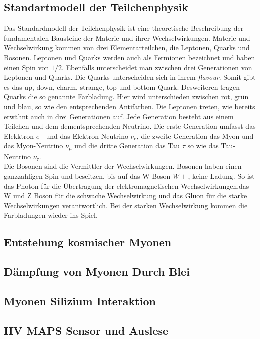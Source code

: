 \subsection{Standartmodell der Teilchenphysik} \label{standartmodell}
Das Standardmodell der Teilchenphysik ist eine theoretische Beschreibung der fundamentalen Bausteine der Materie und ihrer Wechselwirkungen.
Materie und Wechselwirkung kommen von drei Elementarteilchen, die Leptonen, Quarks und Bosonen. 
Leptonen und Quarks werden auch als Fermionen bezeichnet und haben einen Spin von $1/2$. 
Ebenfalls unterscheidet man zwischen drei Generationen von Leptonen und Quarks. 
Die Quarks unterscheiden sich in ihrem \textit{flavour}. 
Somit gibt es das up, down, charm, strange, top und bottom Quark. 
Desweiteren tragen Quarks die so genannte Farbladung.
Hier wird unterschieden zwischen rot, grün und blau, so wie den entsprechenden Antifarben. 
Die Leptonen treten, wie bereits erwähnt auch in drei Generationen auf. 
Jede Generation besteht aus einem Teilchen und dem dementsprechenden Neutrino. 
Die erste Generation umfasst das Elekktron $e^{-}$ und das Elektron-Neutrino $\nu_e$, die zweite Generation das Myon und das Myon-Neutrino $\nu_{\mu}$ und die dritte Generation das Tau $\tau$ so wie das Tau-Neutrino $\nu_{\tau}$.\\
\newline 
Die Bosonen sind die Vermittler der Wechselwirkungen. 
Bosonen haben einen ganzzahligen Spin und beseitzen, bis auf das W Boson $W\pm$, keine Ladung. 
So ist das Photon für die Übertragung der elektromagnetischen Wechselwirkungen,das W und Z Boson für die schwache Wechselwirkung und das Gluon für die starke Wechselwirkungen verantwortlich. 
Bei der starken Wechselwirkung kommen die Farbladungen wieder ins Spiel.


\subsection{Entstehung kosmischer Myonen}



\subsection{Dämpfung von Myonen Durch Blei}



\subsection{Myonen Silizium Interaktion}



\subsection{HV MAPS Sensor und Auslese}